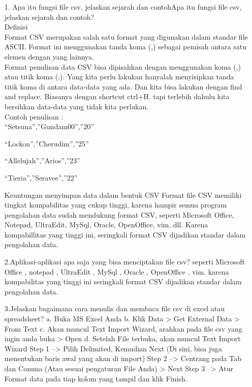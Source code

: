 \documentclass[10pt]{article}
\begin{document}
\begin{enumerate}

\item[1. Apa itu fungsi file csv, jelaskan sejarah dan contohApa itu fungsi file csv, jelaskan sejarah dan contoh?]\\
Definisi\\
Format CSV merupakan salah satu format yang digunakan dalam standar file ASCII. Format ini menggunakan tanda koma (,) sebagai pemisah antara satu elemen dengan yang lainnya.\\

Format penulisan data
CSV bisa dipisahkan dengan menggunakan koma (,) atau titik koma (;). Yang kita perlu lakukan hanyalah menyisipkan tanda titik koma di antara data-data yang ada. Dan kita bisa lakukan dengan find and replace. Biasanya dengan shortcut ctrl+H. tapi terlebih dahulu kita bersihkan data-data yang tidak kita perlukan.\\

Contoh penulisan :\\
“Setsuna”,”Gundam00”,”20”

“Lockon”,”Cherudim”,”25”

“Allelujah”,”Arios”,”23”

“Tieria”,”Seravee”,”22”

Keuntungan menyimpan data dalam bentuk CSV
Format file CSV memiliki tingkat kompabilitas yang cukup tinggi, karena hampir semua program pengolahan data sudah mendukung format CSV, seperti Microsoft Office, Notepad, UltraEdit, MySql, Oracle, OpenOffice, vim, dll. Karena kompabillitas yang tinggi ini, seringkali format CSV dijadikan standar dalam pengolahan data.\\

\item[2.Aplikasi-aplikasi apa saja yang bisa menciptakan file csv?]
seperti Microsoft Office , notepad , UltraEdit , MySql , Oracle , OpenOffice , vim. karena kompabilitas yang tinggi ini seringkali format CSV dijadikan standar dalam pengolahan data.\\

\item[3.Jelaskan bagaimana cara menulis dan membaca file csv di excel atau spreadsheet?]
    a. Buka MS Excel Anda
	b. Klik Data > Get External Data > From Text
	c. Akan muncul Text Import Wizard, arahkan pada file csv yang ingin anda buka > Open
	d. Setelah File terbuka, akan muncul Text Import Wizard	
Step 1 –> Pilih Delimited, Kemudian Next (Di sini, bisa juga menentukan baris awal yang akan di import)
Step 2 –> Centrang pada Tab dan Comma (Atau sesuai pengaturan File Anda) > Next
Step 3 –> Atur Format data pada tiap kolom yang tampil dan klik Finish.\\


\end{enumerate}
\end{document}

